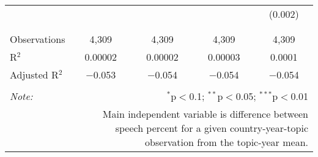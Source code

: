 \begin{table}[!htbp]
\begin{tabular}{@{\extracolsep{5pt}}lcccc}
  &  &  &  & (0.002) \\ 
  & & & & \\ 
\hline \\[-1.8ex] 
Observations & 4,309 & 4,309 & 4,309 & 4,309 \\ 
R$^{2}$ & 0.00002 & 0.00002 & 0.00003 & 0.0001 \\ 
Adjusted R$^{2}$ & $-$0.053 & $-$0.054 & $-$0.054 & $-$0.054 \\ 
\hline 
\hline \\[-1.8ex] 
\textit{Note:}  & \multicolumn{4}{r}{$^{*}$p$<$0.1; $^{**}$p$<$0.05; $^{***}$p$<$0.01} \\ 
 & \multicolumn{4}{r}{Main independent variable is difference between speech percent for a given country-year-topic observation from the topic-year mean.} \\ 
\end{tabular} 
\end{table} 
